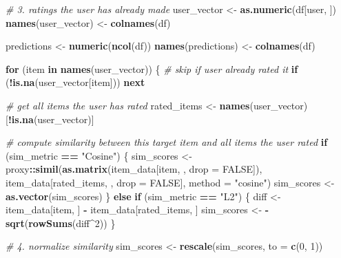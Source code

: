 \documentclass[
]{article}
\newenvironment{Shaded}{\begin{snugshade}}{\end{snugshade}}
\newcommand{\AttributeTok}[1]{\textcolor[rgb]{0.13,0.29,0.53}{#1}}
\newcommand{\CommentTok}[1]{\textcolor[rgb]{0.56,0.35,0.01}{\textit{#1}}}
\newcommand{\ConstantTok}[1]{\textcolor[rgb]{0.56,0.35,0.01}{#1}}
\newcommand{\ControlFlowTok}[1]{\textcolor[rgb]{0.13,0.29,0.53}{\textbf{#1}}}
\newcommand{\DecValTok}[1]{\textcolor[rgb]{0.00,0.00,0.81}{#1}}
\newcommand{\FunctionTok}[1]{\textcolor[rgb]{0.13,0.29,0.53}{\textbf{#1}}}
\newcommand{\NormalTok}[1]{#1}
\newcommand{\OtherTok}[1]{\textcolor[rgb]{0.56,0.35,0.01}{#1}}
\newcommand{\SpecialCharTok}[1]{\textcolor[rgb]{0.81,0.36,0.00}{\textbf{#1}}}
\newcommand{\StringTok}[1]{\textcolor[rgb]{0.31,0.60,0.02}{#1}}
\begin{document}
\begin{Shaded}
\begin{Highlighting}[]
  \CommentTok{\# 3. ratings the user has already made}
\NormalTok{  user\_vector }\OtherTok{\textless{}{-}} \FunctionTok{as.numeric}\NormalTok{(df[user, ])}
  \FunctionTok{names}\NormalTok{(user\_vector) }\OtherTok{\textless{}{-}} \FunctionTok{colnames}\NormalTok{(df)}

\NormalTok{  predictions }\OtherTok{\textless{}{-}} \FunctionTok{numeric}\NormalTok{(}\FunctionTok{ncol}\NormalTok{(df))}
  \FunctionTok{names}\NormalTok{(predictions) }\OtherTok{\textless{}{-}} \FunctionTok{colnames}\NormalTok{(df)}

  \ControlFlowTok{for}\NormalTok{ (item }\ControlFlowTok{in} \FunctionTok{names}\NormalTok{(user\_vector)) \{}
    \CommentTok{\# skip if user already rated it}
    \ControlFlowTok{if}\NormalTok{ (}\SpecialCharTok{!}\FunctionTok{is.na}\NormalTok{(user\_vector[item])) }\ControlFlowTok{next}

    \CommentTok{\# get all items the user has rated}
\NormalTok{    rated\_items }\OtherTok{\textless{}{-}} \FunctionTok{names}\NormalTok{(user\_vector)[}\SpecialCharTok{!}\FunctionTok{is.na}\NormalTok{(user\_vector)]}

    \CommentTok{\# compute similarity between this target item and all items the user rated}
    \ControlFlowTok{if}\NormalTok{ (sim\_metric }\SpecialCharTok{==} \StringTok{"Cosine"}\NormalTok{) \{}
\NormalTok{      sim\_scores }\OtherTok{\textless{}{-}}\NormalTok{ proxy}\SpecialCharTok{::}\FunctionTok{simil}\NormalTok{(}\FunctionTok{as.matrix}\NormalTok{(item\_data[item, , }\AttributeTok{drop =} \ConstantTok{FALSE}\NormalTok{]),}
\NormalTok{                                 item\_data[rated\_items, , }\AttributeTok{drop =} \ConstantTok{FALSE}\NormalTok{],}
                                 \AttributeTok{method =} \StringTok{"cosine"}\NormalTok{)}
\NormalTok{      sim\_scores }\OtherTok{\textless{}{-}} \FunctionTok{as.vector}\NormalTok{(sim\_scores)}
\NormalTok{    \} }\ControlFlowTok{else} \ControlFlowTok{if}\NormalTok{ (sim\_metric }\SpecialCharTok{==} \StringTok{"L2"}\NormalTok{) \{}
\NormalTok{      diff }\OtherTok{\textless{}{-}}\NormalTok{ item\_data[item, ] }\SpecialCharTok{{-}}\NormalTok{ item\_data[rated\_items, ]}
\NormalTok{      sim\_scores }\OtherTok{\textless{}{-}} \SpecialCharTok{{-}}\FunctionTok{sqrt}\NormalTok{(}\FunctionTok{rowSums}\NormalTok{(diff}\SpecialCharTok{\^{}}\DecValTok{2}\NormalTok{))}
\NormalTok{    \}}

    \CommentTok{\# 4. normalize similarity}
\NormalTok{    sim\_scores }\OtherTok{\textless{}{-}} \FunctionTok{rescale}\NormalTok{(sim\_scores, }\AttributeTok{to =} \FunctionTok{c}\NormalTok{(}\DecValTok{0}\NormalTok{, }\DecValTok{1}\NormalTok{))}


\end{Highlighting}
\end{Shaded}
\end{document}
